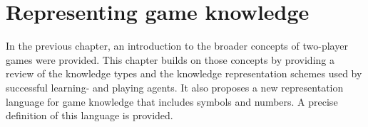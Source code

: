 


\chapter{Representing game knowledge}
\label{chap:kr}
{\chapterintro
In the previous chapter, an introduction to the broader concepts of two-player games were provided.  This chapter builds on those concepts by providing a review of the knowledge types and the knowledge representation schemes used by successful learning- and playing agents.  It also proposes a new representation language for game knowledge that includes symbols and numbers. A precise definition of this language is provided.}

